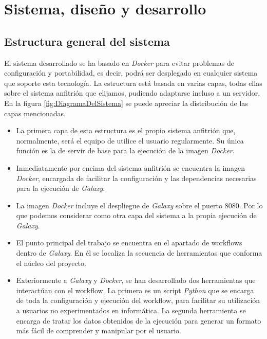 \chapter{Sistema, diseño y desarrollo}
\label{chap:sistemadesarrollado}

\section{Estructura general del sistema}

El sistema desarrollado se ha basado en \textit{Docker} para evitar problemas de configuración y portabilidad, es decir, podrá ser desplegado en cualquier sistema que soporte esta tecnología. La estructura está basada en varias capas, todas ellas sobre el sistema anfitrión que elijamos, pudiendo adaptarse incluso a un servidor. En la figura   \ref{fig:DiagramaDelSistema} se puede apreciar la distribución de las capas mencionadas. 

\begin{itemize}
\item La primera capa de esta estructura es el propio sistema anfitrión que, normalmente, será el equipo de utilice el usuario regularmente. Su única función es la de servir de base para la ejecución de la imagen {\itshape{Docker}}.
\item Inmediatamente por encima del sistema anfitrión se encuentra la imagen {\itshape{Docker}}, encargada de facilitar la configuración y las dependencias necesarias para la ejecución de {\itshape{Galaxy}}.
\item La imagen {\itshape{Docker}} incluye el despliegue de {\itshape{Galaxy}} sobre el puerto 8080. Por lo que podemos considerar como otra capa del sistema a la propia ejecución de {\itshape{Galaxy}}.
\item El punto principal del trabajo se encuentra en el apartado de workflows dentro de {\itshape{Galaxy}}. En él se localiza la secuencia de herramientas que conforma el núcleo del proyecto.
\item Exteriormente a {\itshape{Galaxy}} y {\itshape{Docker}}, se han desarrollado dos herramientas que interactúan con el workflow. La primera es un script {\itshape{Python}} que se encarga de toda la configuración y ejecución del workflow, para facilitar su utilización a usuarios no experimentados en informática. La segunda herramienta se encarga de tratar los datos obtenidos de la ejecución para generar un formato más fácil de comprender y manipular por el usuario.
\end{itemize}

